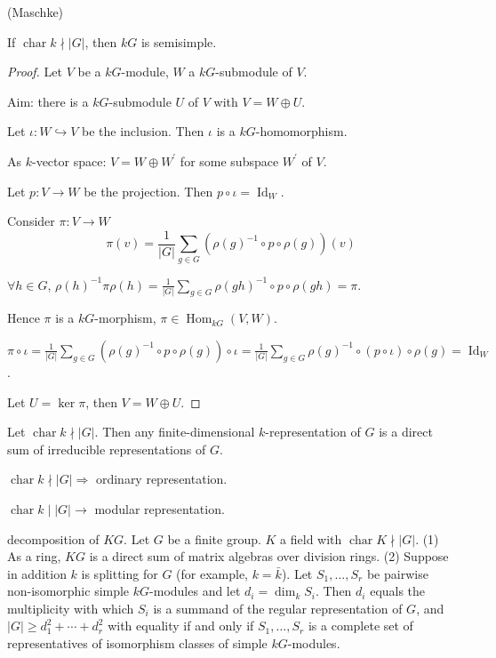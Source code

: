 \documentclass[11pt, a4paper]{report}
\begin{document}
\begin{theorem}
(Maschke)

If $\operatorname{char} k \nmid |G|$, then $kG$ is semisimple.
\end{theorem}

\begin{proof}
Let $V$ be a $kG$-module, $W$ a $kG$-submodule of $V$.

Aim: there is a $kG$-submodule $U$ of $V$ with $V = W \oplus U$.

Let $\iota: W \hookrightarrow V$ be the inclusion. Then $\iota$ is a $kG$-homomorphism.

As $k$-vector space: $V = W \oplus W^{\prime}$ for some subspace $W^{\prime}$ of $V$.

Let $p: V \rightarrow W$ be the projection. Then $p \circ \iota = \operatorname{Id}_{W}$.

Consider $\pi: V \rightarrow W$
\[
\pi(v) = \frac{1}{|G|} \sum_{g \in G}\left(\rho(g)^{-1} \circ p \circ \rho(g)\right)(v)
\]

$\forall h \in G$, $\rho(h)^{-1} \pi \rho(h) = \frac{1}{|G|} \sum_{g \in G} \rho(gh)^{-1} \circ p \circ \rho(gh) = \pi$.

Hence $\pi$ is a $kG$-morphism, $\pi \in \operatorname{Hom}_{kG}(V, W)$.

$\pi \circ \iota = \frac{1}{|G|} \sum_{g \in G}\left(\rho(g)^{-1} \circ p \circ \rho(g)\right) \circ \iota = \frac{1}{|G|} \sum_{g \in G} \rho(g)^{-1} \circ (p \circ \iota) \circ \rho(g) = \operatorname{Id}_{W}$.

Let $U = \ker \pi$, then $V = W \oplus U$.
\end{proof}

\begin{corollary}

\end{corollary}

\begin{corollary}
Let $\operatorname{char} k \nmid |G|$. Then any finite-dimensional $k$-representation of $G$ is a direct sum of irreducible representations of $G$.

$\operatorname{char} k \nmid |G| \Rightarrow$ ordinary representation.

$\operatorname{char} k \mid |G| \rightarrow$ modular representation.
\end{corollary}

\begin{proposition}
decomposition of $KG$.
Let $G$ be a finite group. $K$ a field with $\operatorname{char} K \nmid |G|$.
(1) As a ring, $KG$ is a direct sum of matrix algebras over division rings.
(2) Suppose in addition $k$ is splitting for $G$ (for example, $k=\bar{k}$). Let $S_{1}, \ldots, S_{r}$ be pairwise non-isomorphic simple $kG$-modules and let $d_{i}=\operatorname{dim}_{k} S_{i}$. Then $d_{i}$ equals the multiplicity with which $S_{i}$ is a summand of the regular representation of $G$, and $|G| \geqslant d_{1}^{2}+\cdots+d_{r}^{2}$ with equality if and only if $S_{1}, \ldots, S_{r}$ is a complete set of representatives of isomorphism classes of simple $kG$-modules.

\end{proposition}
\end{document}
